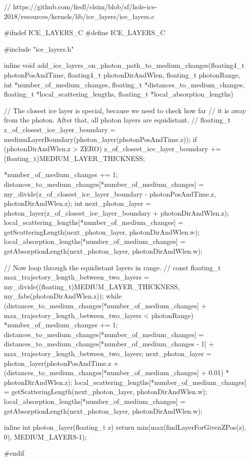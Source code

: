 \begin{ccode}
// https://github.com/fiedl/clsim/blob/sf/hole-ice-2018/resources/kernels/lib/ice_layers/ice_layers.c

#ifndef ICE_LAYERS_C
#define ICE_LAYERS_C

#include "ice_layers.h"

inline void add_ice_layers_on_photon_path_to_medium_changes(floating4_t photonPosAndTime, floating4_t photonDirAndWlen, floating_t photonRange, int *number_of_medium_changes, floating_t *distances_to_medium_changes, floating_t *local_scattering_lengths, floating_t *local_absorption_lengths)
{

  // The closest ice layer is special, because we need to check how far
  // it is away from the photon. After that, all photon layers are equidistant.
  //
  floating_t z_of_closest_ice_layer_boundary =
      mediumLayerBoundary(photon_layer(photonPosAndTime.z));
  if (photonDirAndWlen.z > ZERO) z_of_closest_ice_layer_boundary +=
      (floating_t)MEDIUM_LAYER_THICKNESS;

  *number_of_medium_changes += 1;
  distances_to_medium_changes[*number_of_medium_changes] =
      my_divide(z_of_closest_ice_layer_boundary - photonPosAndTime.z, photonDirAndWlen.z);
  int next_photon_layer =
      photon_layer(z_of_closest_ice_layer_boundary + photonDirAndWlen.z);
  local_scattering_lengths[*number_of_medium_changes] =
      getScatteringLength(next_photon_layer, photonDirAndWlen.w);
  local_absorption_lengths[*number_of_medium_changes] =
      getAbsorptionLength(next_photon_layer, photonDirAndWlen.w);

  // Now loop through the equidistant layers in range.
  //
  const floating_t max_trajectory_length_between_two_layers =
      my_divide((floating_t)MEDIUM_LAYER_THICKNESS, my_fabs(photonDirAndWlen.z));
  while (distances_to_medium_changes[*number_of_medium_changes] + max_trajectory_length_between_two_layers < photonRange)
  {
    *number_of_medium_changes += 1;
    distances_to_medium_changes[*number_of_medium_changes] =
        distances_to_medium_changes[*number_of_medium_changes - 1]
        + max_trajectory_length_between_two_layers;
    next_photon_layer = photon_layer(photonPosAndTime.z
        + (distances_to_medium_changes[*number_of_medium_changes] + 0.01) * photonDirAndWlen.z);
    local_scattering_lengths[*number_of_medium_changes] =
        getScatteringLength(next_photon_layer, photonDirAndWlen.w);
    local_absorption_lengths[*number_of_medium_changes] =
        getAbsorptionLength(next_photon_layer, photonDirAndWlen.w);
  }

}

inline int photon_layer(floating_t z)
{
  return min(max(findLayerForGivenZPos(z), 0), MEDIUM_LAYERS-1);
}

#endif
\end{ccode}

